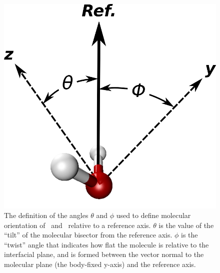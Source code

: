 \begin{figure}[h!]
	\begin{center}
		\includegraphics[scale=1.0]{images/angle-cartoons/wateranglessmall.png}
		\caption{The definition of the angles $\theta$ and $\phi$ used to define molecular orientation of \suldiox~and \wat~relative to a reference axis. $\theta$ is the value of the ``tilt'' of the molecular bisector from the reference axis. $\phi$ is the ``twist'' angle that indicates how flat the molecule is relative to the interfacial plane, and is formed between the vector normal to the molecular plane (the body-fixed y-axis) and the reference axis.}
		\label{fig:water-angles}
	\end{center}
\end{figure}



